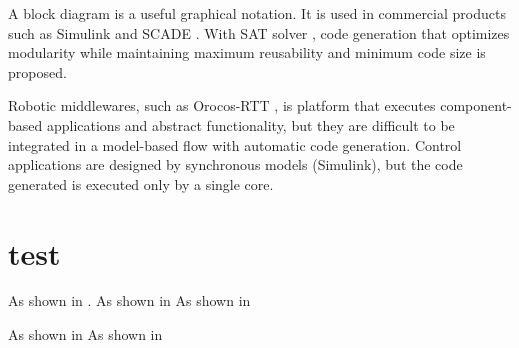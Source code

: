 \documentclass[conference,compsoc]{IEEEtran}
\begin{document}
 A block diagram is a useful graphical notation. 
It is used in commercial products such as Simulink and SCADE \cite{Lublinerman:2009:MCG:1480881.1480893}.
With SAT solver \cite{Lublinerman:2009:MCG:1480881.1480893}, code generation that optimizes modularity while maintaining maximum reusability and minimum code size is proposed.

 Robotic middlewares, such as Orocos-RTT \cite{}, is platform that executes component-based applications and abstract functionality, but they are difficult to be integrated in a model-based flow with automatic code generation.
 Control applications are designed by synchronous models (Simulink), but the code generated is executed only by a single core.



\section{test}

As shown in \cite{Deng:2015:MSF:2735960.2735972}.
As shown in \cite{6871195}
As shown in \cite{4550788}

As shown in \cite{Lublinerman:2009:MCG:1480881.1480893}
As shown in \cite{Ptolemaeus:14:SystemDesign}


\end{document}
